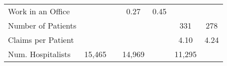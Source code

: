 \begin{table}[ht!]
\begin{tabular}[t]{lcccccc}
\hspace{1em}Work in an Office &  &  & 0.27 & 0.45 &  & \\
\addlinespace[0.3em]
\hspace{1em}Number of Patients &  &  &  &  & 331 & 278\\
\hspace{1em}Claims per Patient &  &  &  &  & 4.10 & 4.24\\
\addlinespace[0.6em]
Num. Hospitalists & 15,465 &  & 14,969 &  & 11,295 & \\
\bottomrule
\end{tabular}\label{tab:sumstatsnew}
\end{table}